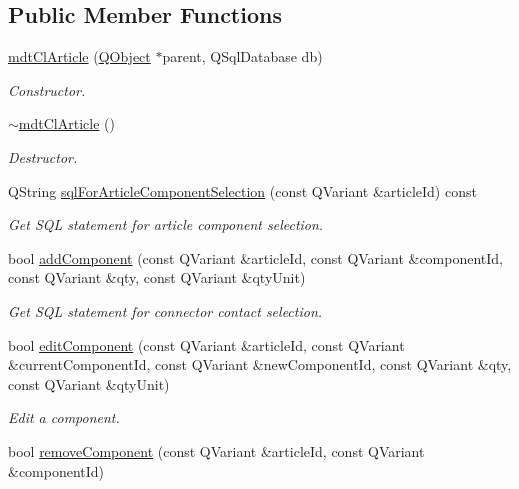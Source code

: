 \subsection*{Public Member Functions}
\begin{DoxyCompactItemize}
\item 
\hyperlink{classmdt_cl_article_a73d0867f06c579293bbfcbfc3f305616}{mdt\-Cl\-Article} (\hyperlink{class_q_object}{Q\-Object} $\ast$parent, Q\-Sql\-Database db)
\begin{DoxyCompactList}\small\item\em Constructor. \end{DoxyCompactList}\item 
\hyperlink{classmdt_cl_article_ac51272d232283ed61551e965abf3e112}{$\sim$mdt\-Cl\-Article} ()
\begin{DoxyCompactList}\small\item\em Destructor. \end{DoxyCompactList}\item 
Q\-String \hyperlink{classmdt_cl_article_ab739ef3c89503d971ded5830787dc4ff}{sql\-For\-Article\-Component\-Selection} (const Q\-Variant \&article\-Id) const 
\begin{DoxyCompactList}\small\item\em Get S\-Q\-L statement for article component selection. \end{DoxyCompactList}\item 
bool \hyperlink{classmdt_cl_article_a01746b199b707377f29a463bfc12452d}{add\-Component} (const Q\-Variant \&article\-Id, const Q\-Variant \&component\-Id, const Q\-Variant \&qty, const Q\-Variant \&qty\-Unit)
\begin{DoxyCompactList}\small\item\em Get S\-Q\-L statement for connector contact selection. \end{DoxyCompactList}\item 
bool \hyperlink{classmdt_cl_article_a065c948e09af084586a4c1b110afefbb}{edit\-Component} (const Q\-Variant \&article\-Id, const Q\-Variant \&current\-Component\-Id, const Q\-Variant \&new\-Component\-Id, const Q\-Variant \&qty, const Q\-Variant \&qty\-Unit)
\begin{DoxyCompactList}\small\item\em Edit a component. \end{DoxyCompactList}\item 
bool \hyperlink{classmdt_cl_article_a05d365a0488e479a15ff158353a41aab}{remove\-Component} (const Q\-Variant \&article\-Id, const Q\-Variant \&component\-Id)

\end{DoxyCompactItemize}
